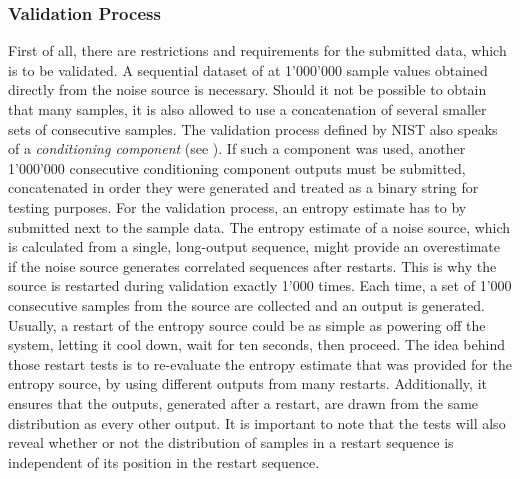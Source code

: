 \subsubsection{Validation Process}
First of all, there are restrictions and requirements for the submitted data, which is to be validated.
A sequential dataset of at 1'000'000 sample values obtained directly from the noise source is necessary.
Should it not be possible to obtain that many samples, it is also allowed to use a concatenation of several smaller sets of consecutive samples.
\newline
The validation process defined by NIST also speaks of a \emph{conditioning component} (see ).
If such a component was used, another 1'000'000 consecutive conditioning component outputs must be submitted, concatenated in order they were generated and treated as a binary string for testing purposes.
\emptyline
For the validation process, an entropy estimate has to by submitted next to the sample data. 
The entropy estimate of a noise source, which is calculated from a single, long-output sequence, might
provide an overestimate if the noise source generates correlated sequences after restarts. 
This is why the source is restarted during validation exactly 1'000 times. Each time, a set of 1'000 consecutive samples from the source are collected and an output is generated.
\newline
Usually, a restart of the entropy source could be as simple as powering off the system, letting it cool down, wait for ten seconds, then proceed.
\newline
The idea behind those restart tests is to re-evaluate the entropy estimate that was provided for the entropy source, by using different outputs from many restarts. Additionally, it ensures that the outputs, generated after a restart, are drawn from the same distribution as every other output.
It is important to note that the tests will also reveal whether or not the distribution of samples in a restart sequence is independent of its position in the restart sequence.


